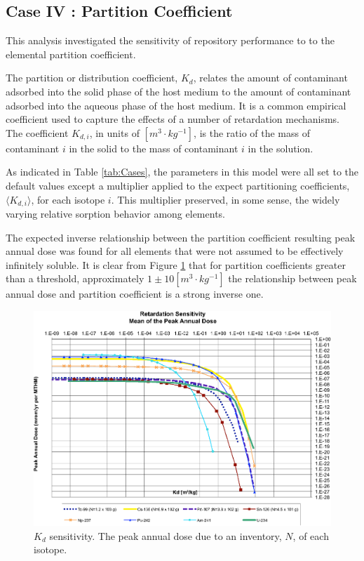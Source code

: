 
\subsection{Case IV : Partition Coefficient}

This analysis investigated the sensitivity of repository performance to
to the elemental partition coefficient. 

The partition or distribution coefficient, $K_d$, relates the amount of contaminant adsorbed into the 
solid phase of the host medium to the amount of contaminant adsorbed into the 
aqueous phase of the host medium. It is a common empirical coefficient used to 
capture the effects of a number of retardation mechanisms. The coefficient 
$K_{d,i}$, in units of $[m^3\cdot kg^{-1}]$, is the ratio of the mass of 
contaminant $i$ in the solid to the mass of contaminant $i$ in the solution.

As indicated in Table \ref{tab:Cases}, the parameters in this model were all set 
to the default values except a multiplier applied to the expect partitioning 
coefficients, $\langle K_{d,i} \rangle$, for each isotope $i$. This multiplier 
preserved, in some sense, the widely varying 
relative sorption behavior among elements. 

The expected inverse relationship between the partition coefficient resulting 
peak annual dose was found for all elements that were not assumed to be 
effectively infinitely soluble.  It is clear from Figure \ref{fig:KdSum} that 
for partition coefficients greater than a threshold, approximately 
  $1\pm10[m^3\cdot kg^{-1}]$ the relationship between 
peak annual dose and partition coefficient is a strong inverse one. 

\begin{figure}[ht]
  \centering
  \includegraphics[width=\linewidth]{Partitioning_Summary.eps}
  \caption{$K_d$ sensitivity.  The peak annual dose due to an inventory, 
  $N$, of each isotope.}
  \label{fig:KdSum}
\end{figure}

